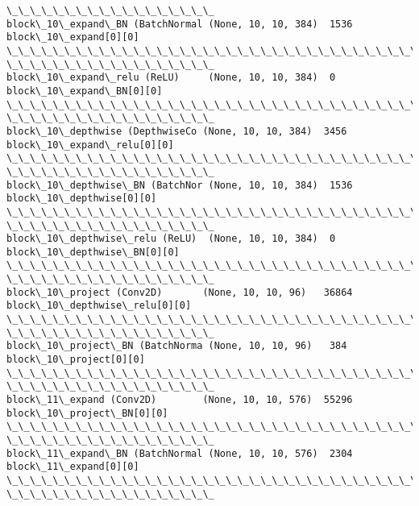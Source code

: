 \documentclass[11pt]{article}
\begin{document}
\begin{Verbatim}[commandchars=\\\{\}]
\_\_\_\_\_\_\_\_\_\_\_\_\_\_\_\_\_\_
block\_10\_expand\_BN (BatchNormal (None, 10, 10, 384)  1536
block\_10\_expand[0][0]
\_\_\_\_\_\_\_\_\_\_\_\_\_\_\_\_\_\_\_\_\_\_\_\_\_\_\_\_\_\_\_\_\_\_\_\_\_\_\_\_\_\_\_\_\_\_\_\_\_\_\_\_\_\_\_\_\_\_\_\_\_\_\_\_\_\_\_\_\_\_\_\_\_\_\_\_\_\_\_\_
\_\_\_\_\_\_\_\_\_\_\_\_\_\_\_\_\_\_
block\_10\_expand\_relu (ReLU)     (None, 10, 10, 384)  0
block\_10\_expand\_BN[0][0]
\_\_\_\_\_\_\_\_\_\_\_\_\_\_\_\_\_\_\_\_\_\_\_\_\_\_\_\_\_\_\_\_\_\_\_\_\_\_\_\_\_\_\_\_\_\_\_\_\_\_\_\_\_\_\_\_\_\_\_\_\_\_\_\_\_\_\_\_\_\_\_\_\_\_\_\_\_\_\_\_
\_\_\_\_\_\_\_\_\_\_\_\_\_\_\_\_\_\_
block\_10\_depthwise (DepthwiseCo (None, 10, 10, 384)  3456
block\_10\_expand\_relu[0][0]
\_\_\_\_\_\_\_\_\_\_\_\_\_\_\_\_\_\_\_\_\_\_\_\_\_\_\_\_\_\_\_\_\_\_\_\_\_\_\_\_\_\_\_\_\_\_\_\_\_\_\_\_\_\_\_\_\_\_\_\_\_\_\_\_\_\_\_\_\_\_\_\_\_\_\_\_\_\_\_\_
\_\_\_\_\_\_\_\_\_\_\_\_\_\_\_\_\_\_
block\_10\_depthwise\_BN (BatchNor (None, 10, 10, 384)  1536
block\_10\_depthwise[0][0]
\_\_\_\_\_\_\_\_\_\_\_\_\_\_\_\_\_\_\_\_\_\_\_\_\_\_\_\_\_\_\_\_\_\_\_\_\_\_\_\_\_\_\_\_\_\_\_\_\_\_\_\_\_\_\_\_\_\_\_\_\_\_\_\_\_\_\_\_\_\_\_\_\_\_\_\_\_\_\_\_
\_\_\_\_\_\_\_\_\_\_\_\_\_\_\_\_\_\_
block\_10\_depthwise\_relu (ReLU)  (None, 10, 10, 384)  0
block\_10\_depthwise\_BN[0][0]
\_\_\_\_\_\_\_\_\_\_\_\_\_\_\_\_\_\_\_\_\_\_\_\_\_\_\_\_\_\_\_\_\_\_\_\_\_\_\_\_\_\_\_\_\_\_\_\_\_\_\_\_\_\_\_\_\_\_\_\_\_\_\_\_\_\_\_\_\_\_\_\_\_\_\_\_\_\_\_\_
\_\_\_\_\_\_\_\_\_\_\_\_\_\_\_\_\_\_
block\_10\_project (Conv2D)       (None, 10, 10, 96)   36864
block\_10\_depthwise\_relu[0][0]
\_\_\_\_\_\_\_\_\_\_\_\_\_\_\_\_\_\_\_\_\_\_\_\_\_\_\_\_\_\_\_\_\_\_\_\_\_\_\_\_\_\_\_\_\_\_\_\_\_\_\_\_\_\_\_\_\_\_\_\_\_\_\_\_\_\_\_\_\_\_\_\_\_\_\_\_\_\_\_\_
\_\_\_\_\_\_\_\_\_\_\_\_\_\_\_\_\_\_
block\_10\_project\_BN (BatchNorma (None, 10, 10, 96)   384
block\_10\_project[0][0]
\_\_\_\_\_\_\_\_\_\_\_\_\_\_\_\_\_\_\_\_\_\_\_\_\_\_\_\_\_\_\_\_\_\_\_\_\_\_\_\_\_\_\_\_\_\_\_\_\_\_\_\_\_\_\_\_\_\_\_\_\_\_\_\_\_\_\_\_\_\_\_\_\_\_\_\_\_\_\_\_
\_\_\_\_\_\_\_\_\_\_\_\_\_\_\_\_\_\_
block\_11\_expand (Conv2D)        (None, 10, 10, 576)  55296
block\_10\_project\_BN[0][0]
\_\_\_\_\_\_\_\_\_\_\_\_\_\_\_\_\_\_\_\_\_\_\_\_\_\_\_\_\_\_\_\_\_\_\_\_\_\_\_\_\_\_\_\_\_\_\_\_\_\_\_\_\_\_\_\_\_\_\_\_\_\_\_\_\_\_\_\_\_\_\_\_\_\_\_\_\_\_\_\_
\_\_\_\_\_\_\_\_\_\_\_\_\_\_\_\_\_\_
block\_11\_expand\_BN (BatchNormal (None, 10, 10, 576)  2304
block\_11\_expand[0][0]
\_\_\_\_\_\_\_\_\_\_\_\_\_\_\_\_\_\_\_\_\_\_\_\_\_\_\_\_\_\_\_\_\_\_\_\_\_\_\_\_\_\_\_\_\_\_\_\_\_\_\_\_\_\_\_\_\_\_\_\_\_\_\_\_\_\_\_\_\_\_\_\_\_\_\_\_\_\_\_\_
\_\_\_\_\_\_\_\_\_\_\_\_\_\_\_\_\_\_

\end{Verbatim}
\end{document}
